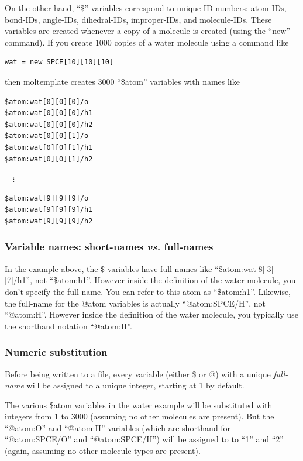 \documentclass[11pt]{article}
\begin{document}
On the other hand, ``\$'' variables correspond 
to unique ID numbers: atom-IDs, bond-IDs,
angle-IDs, dihedral-IDs, improper-IDs, and molecule-IDs.  These
variables are created whenever a copy of a molecule is created (using
the ``new'' command).  
If you create 1000 copies of a water molecule using a command like 
\begin{verbatim}
wat = new SPCE[10][10][10]
\end{verbatim}
then moltemplate creates 3000 ``\$atom'' variables with names like
\begin{verbatim}
$atom:wat[0][0][0]/o
$atom:wat[0][0][0]/h1
$atom:wat[0][0][0]/h2
$atom:wat[0][0][1]/o
$atom:wat[0][0][1]/h1
$atom:wat[0][0][1]/h2
\end{verbatim}
$\quad \vdots $
\begin{verbatim}
$atom:wat[9][9][9]/o
$atom:wat[9][9][9]/h1
$atom:wat[9][9][9]/h2
\end{verbatim}

\subsubsection{Variable names: short-names \textit{vs.} full-names}
\label{sec:full_names}

In the example above, the \$ variables have full-names like
``\$atom:wat[8][3][7]/h1'', not ``\$atom:h1''.  However inside the
definition of the water molecule, you don't specify the full name.
You can refer to this atom as ``\$atom:h1''.
Likewise, the full-name for the @atom variables is actually
``@atom:SPCE/H'', not ``@atom:H''.  However inside the definition of the water
molecule, you typically use the shorthand notation ``@atom:H''.

\subsubsection{Numeric substitution}
Before being written to a file, every variable (either \$ or @) 
with a unique \textit{full-name} will be assigned to a unique integer, 
starting at 1 by default.

The various \$atom variables in the water example will be substituted 
with integers from 1 to 3000 (assuming no other molecules are present).
But the ``@atom:O'' and ``@atom:H'' variables
(which are shorthand for ``@atom:SPCE/O'' and ``@atom:SPCE/H'')
will be assigned to to ``1'' and ``2''
(again, assuming no other molecule types are present).
\end{document}
